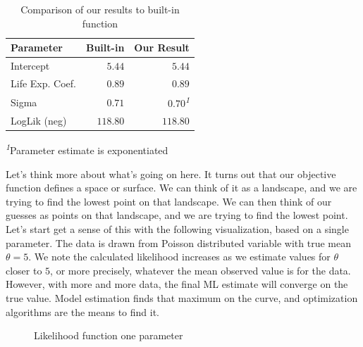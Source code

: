 \documentclass[
  letterpaper,
]{krantz}
\begin{document}
\begin{longtable}{lrr}

\caption{\label{tbl-r-likelihood}Comparison of our results to built-in
function}

\tabularnewline

\toprule
Parameter & Built-in & Our Result \\ 
\midrule\addlinespace[2.5pt]
Intercept & \textcolor[HTML]{404040}{$5.44$} & \textcolor[HTML]{404040}{$5.44$} \\ 
Life Exp. Coef. & \textcolor[HTML]{404040}{$0.89$} & \textcolor[HTML]{404040}{$0.89$} \\ 
Sigma & \textcolor[HTML]{404040}{$0.71$} & \textcolor[HTML]{404040}{$0.70$\textsuperscript{\textit{1}}} \\ 
LogLik (neg) & \textcolor[HTML]{404040}{$118.80$} & \textcolor[HTML]{404040}{$118.80$} \\ 
\bottomrule

\end{longtable}

\begin{minipage}{\linewidth}
\textsuperscript{\textit{1}}Parameter estimate is exponentiated\\
\end{minipage}

Let's think more about what's going on here. It turns out that our
objective function defines a space or surface. We can think of it as a
landscape, and we are trying to find the lowest point on that landscape.
We can then think of our guesses as points on that landscape, and we are
trying to find the lowest point. Let's start get a sense of this with
the following visualization, based on a single parameter. The data is
drawn from Poisson distributed variable with true mean \(\theta=5\). We
note the calculated likelihood increases as we estimate values for
\(\theta\) closer to \(5\), or more precisely, whatever the mean
observed value is for the data. However, with more and more data, the
final ML estimate will converge on the true value. Model estimation
finds that maximum on the curve, and optimization algorithms are the
means to find it.

\begin{figure}[H]


\caption{\label{fig-r-likelihood-plot}Likelihood function one parameter}

\end{figure}%
\end{document}
